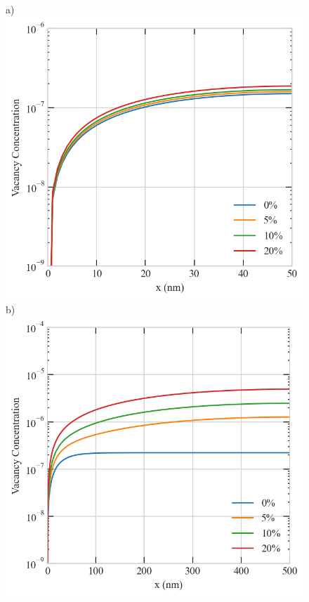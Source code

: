 \documentclass[utf8]{frontiersSCNS} %
\begin{document}
     \begin{figure}[h!]  %
        \centering
        a)\includegraphics[scale=0.55]{srrt/plots/Fig13_a.png}
        b)\includegraphics[scale=0.55]{srrt/plots/Fig13_b.png}
        \\

\end{figure}
\end{document}
